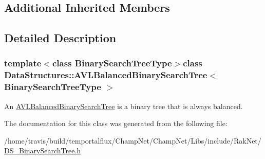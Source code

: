 \subsection*{Additional Inherited Members}


\subsection{Detailed Description}
\subsubsection*{template$<$class Binary\-Search\-Tree\-Type$>$class Data\-Structures\-::\-A\-V\-L\-Balanced\-Binary\-Search\-Tree$<$ Binary\-Search\-Tree\-Type $>$}

An \hyperlink{class_data_structures_1_1_a_v_l_balanced_binary_search_tree}{A\-V\-L\-Balanced\-Binary\-Search\-Tree} is a binary tree that is always balanced. 

The documentation for this class was generated from the following file\-:\begin{DoxyCompactItemize}
\item 
/home/travis/build/temportalflux/\-Champ\-Net/\-Champ\-Net/\-Libs/include/\-Rak\-Net/\hyperlink{_d_s___binary_search_tree_8h}{D\-S\-\_\-\-Binary\-Search\-Tree.\-h}\end{DoxyCompactItemize}
